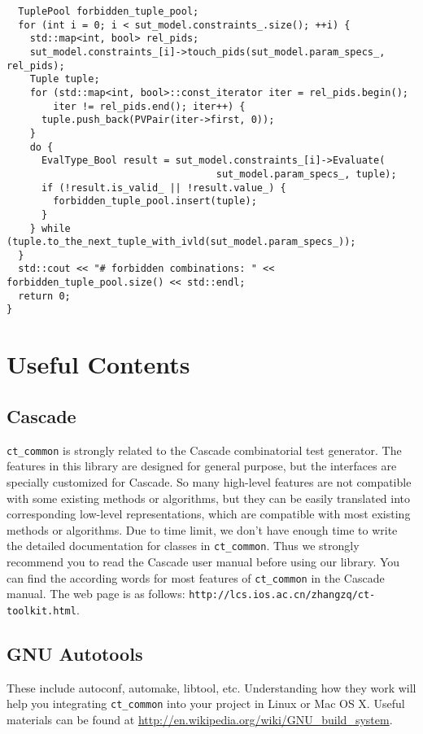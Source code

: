\documentclass{article}
\begin{document}
{\begin{verbatim}
  TuplePool forbidden_tuple_pool;
  for (int i = 0; i < sut_model.constraints_.size(); ++i) {
    std::map<int, bool> rel_pids;
    sut_model.constraints_[i]->touch_pids(sut_model.param_specs_, rel_pids);
    Tuple tuple;
    for (std::map<int, bool>::const_iterator iter = rel_pids.begin();
        iter != rel_pids.end(); iter++) {
      tuple.push_back(PVPair(iter->first, 0));
    }
    do {
      EvalType_Bool result = sut_model.constraints_[i]->Evaluate(
                                    sut_model.param_specs_, tuple);
      if (!result.is_valid_ || !result.value_) {
        forbidden_tuple_pool.insert(tuple);
      }
    } while (tuple.to_the_next_tuple_with_ivld(sut_model.param_specs_));
  }
  std::cout << "# forbidden combinations: " << forbidden_tuple_pool.size() << std::endl;
  return 0;
}
\end{verbatim}
}

\section{Useful Contents}
\subsection*{Cascade}
{\tt ct\_common} is strongly related to the Cascade combinatorial test generator.
The features in this library are designed for general purpose, but the interfaces
are specially customized for Cascade. So many high-level features are not compatible
with some existing methods or algorithms, but they can be easily translated into corresponding
low-level representations, which are compatible with most existing methods or algorithms.
Due to time limit, we don't have enough time to write the detailed documentation
for classes in {\tt ct\_common}. Thus we strongly recommend you to read the Cascade user manual
before using our library. You can find the according words for most
features of {\tt ct\_common} in the Cascade manual. The web page is as follows:
{\tt http://lcs.ios.ac.cn/\texttildelow zhangzq/ct-toolkit.html}.

\subsection*{GNU Autotools}
These include autoconf, automake, libtool, etc. Understanding how they work
will help you integrating {\tt ct\_common} into your project in Linux or Mac OS X.
Useful materials can be found at \url{http://en.wikipedia.org/wiki/GNU_build_system}.
\end{document}
